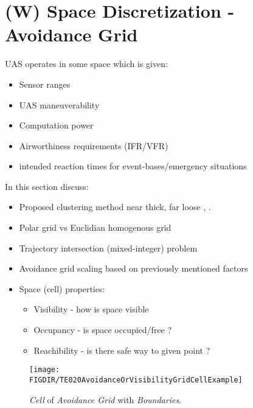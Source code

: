 \section{(W) Space Discretization - Avoidance Grid}\label{s:AvoidanceGrid}
    \noindent UAS operates in some space which is given:
    \begin{itemize}
        \item Sensor ranges
        \item UAS maneuverability
        \item Computation power
        \item Airworthiness requirements (IFR/VFR)
        \item intended reaction times for event-bases/emergency situations
    \end{itemize}
    \noindent In this section discuss:
    \begin{itemize}
    	\item Proposed clustering method near thick, far loose , \cite{zaiane2002clustering}.
        \item Polar grid vs Euclidian homogenous grid
        \item Trajectory intersection (mixed-integer) problem
        \item Avoidance grid scaling based on previously mentioned factors
        \item Space (cell) properties:
        \begin{itemize}
            \item Visibility - how is space visible
            \item Occupancy - is space occupied/free ?
            \item Reachibility - is there safe way to given point ?
        \end{itemize}
    \end{itemize}
    \begin{figure}[H]
        \centering
        \texttt{[image: \\FIGDIR/TE020AvoidanceOrVisibilityGridCellExample]} 
        \caption{\emph{Cell} of \emph{Avoidance Grid} with \emph{Boundaries}.}
        \label{fig:cellBoundariesInAvoidanceGrid}
    \end{figure}
